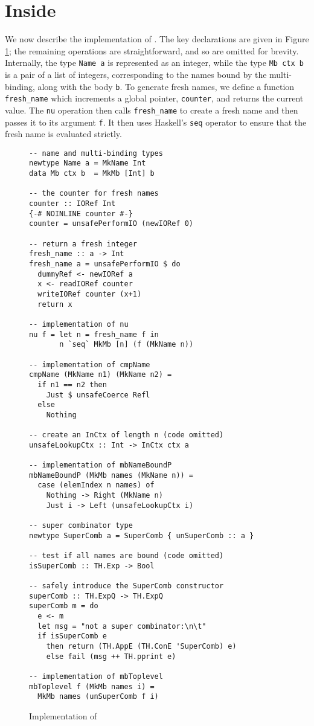 \documentclass[natbib]{sigplanconf}
\begin{document}
\section{Inside \ourlib}
\label{sec:implementation}

We now describe the implementation of \ourlib. The key declarations
are given in Figure \ref{fig:implementation}; the remaining
operations are straightforward, and so are omitted for brevity.
Internally, the type \lstinline{Name a} is represented as an integer,
while the type \lstinline{Mb ctx b} is a pair of a list of integers,
corresponding to the names bound by the multi-binding, along with the
body \lstinline{b}. To generate fresh names, we define a function
\lstinline{fresh_name} which increments a global pointer,
\lstinline{counter}, and returns the current value. The \lstinline{nu}
operation then calls \lstinline{fresh_name} to create a fresh name and
then passes it to its argument \lstinline{f}. It then uses Haskell's
\lstinline{seq} operator to ensure that the fresh name is evaluated
strictly.


\begin{figure}[t]
\begin{lstlisting}[basicstyle=\ttfamily\scriptsize]
-- name and multi-binding types
newtype Name a = MkName Int
data Mb ctx b  = MkMb [Int] b

-- the counter for fresh names
counter :: IORef Int
{-# NOINLINE counter #-}
counter = unsafePerformIO (newIORef 0)

-- return a fresh integer
fresh_name :: a -> Int
fresh_name a = unsafePerformIO $ do 
  dummyRef <- newIORef a
  x <- readIORef counter
  writeIORef counter (x+1)
  return x

-- implementation of nu
nu f = let n = fresh_name f in
       n `seq` MkMb [n] (f (MkName n))

-- implementation of cmpName
cmpName (MkName n1) (MkName n2) =
  if n1 == n2 then
    Just $ unsafeCoerce Refl
  else
    Nothing

-- create an InCtx of length n (code omitted)
unsafeLookupCtx :: Int -> InCtx ctx a

-- implementation of mbNameBoundP
mbNameBoundP (MkMb names (MkName n)) =
  case (elemIndex n names) of
    Nothing -> Right (MkName n)
    Just i -> Left (unsafeLookupCtx i)

-- super combinator type
newtype SuperComb a = SuperComb { unSuperComb :: a }

-- test if all names are bound (code omitted)
isSuperComb :: TH.Exp -> Bool

-- safely introduce the SuperComb constructor
superComb :: TH.ExpQ -> TH.ExpQ
superComb m = do
  e <- m
  let msg = "not a super combinator:\n\t"
  if isSuperComb e
    then return (TH.AppE (TH.ConE 'SuperComb) e)
    else fail (msg ++ TH.pprint e)

-- implementation of mbToplevel
mbToplevel f (MkMb names i) =
  MkMb names (unSuperComb f i)
\end{lstlisting}
\caption{Implementation of \ourlib}
\label{fig:implementation}
\end{figure}
\end{document}
